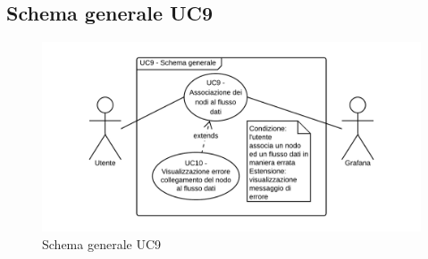 \subsection{Schema generale UC9}
\begin{figure}[H]
\includegraphics{img/UC9_-_Schema_generale.png}
\caption{Schema generale UC9}
\end{figure}
